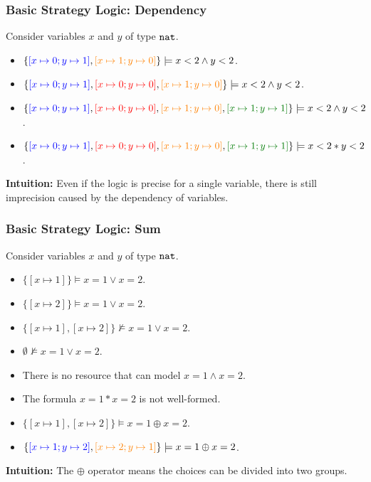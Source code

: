 \begin{frame}[fragile]
    \frametitle{Basic Strategy Logic: Dependency}

\begin{example} Consider variables $x$ and $y$ of type $\Nat$.
    \begin{itemize}
        \item $\{\substxy{blue}{0}{1}, \substxy{orange}{1}{0}\} \models x < 2 \land y < 2$.
        \item $\{\substxy{blue}{0}{1}, \substxy{red}{0}{0}, \substxy{orange}{1}{0}\} \models x < 2 \land y < 2$.
        \item $\{\substxy{blue}{0}{1}, \substxy{red}{0}{0}, \substxy{orange}{1}{0}, \substxy{DeepGreen}{1}{1}\} \models x < 2 \land y < 2$.
        \item $\{\substxy{blue}{0}{1}, \substxy{red}{0}{0}, \substxy{orange}{1}{0}, \substxy{DeepGreen}{1}{1}\} \models x < 2 * y < 2$.
    \end{itemize}
\end{example}

\textbf{Intuition:} Even if the logic is precise for a single variable, there is still imprecision caused by the dependency of variables.

\end{frame}

\begin{frame}[fragile]
    \frametitle{Basic Strategy Logic: Sum}

\begin{example} Consider variables $x$ and $y$ of type $\Nat$.
    \begin{itemize}
        \item $\{[x\mapsto 1]\} \models x = 1 \lor x = 2$.
        \item $\{[x\mapsto 2]\} \models x = 1 \lor x = 2$.
        \item $\{[x\mapsto 1], [x\mapsto 2]\} \not\models x = 1 \lor x = 2$.
        \item $\emptyset \not\models x = 1 \lor x = 2$.
        \item There is no resource that can model $x = 1 \land x = 2$.
        \item The formula $x = 1 * x = 2$ is not well-formed.
        \item $\{[x\mapsto 1], [x\mapsto 2]\} \models x = 1 \oplus x = 2$.
        \item $\{\substxy{blue}{1}{2}, \substxy{orange}{2}{1}\} \models x = 1 \oplus x = 2$.  
    \end{itemize}
\end{example}

\textbf{Intuition:} The $\oplus$ operator means the choices can be divided into two groups.

\end{frame}

